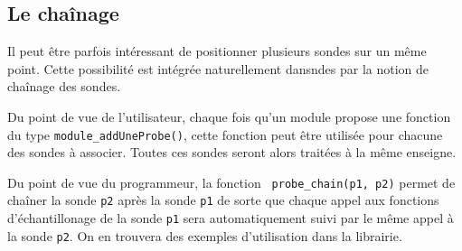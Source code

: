 %
\subsection{Le chaînage}

   Il peut être parfois intéressant de positionner plusieurs sondes
sur un même point. Cette possibilité est intégrée naturellement
dans{\sc ndes} par la notion de chaînage des sondes.

   Du point de vue de l'utilisateur, chaque fois qu'un module propose
une fonction du type {\tt module\_addUneProbe()}, cette fonction peut
être utilisée pour chacune des sondes à associer. Toutes ces sondes
seront alors traitées à la même enseigne.

   Du point de vue du programmeur, la fonction {\tt
probe\_chain(p1, p2)}  permet de chaîner la sonde
   {\tt p2} après la sonde {\tt p1} de sorte que chaque appel aux
     fonctions d'échantillonage de la sonde {\tt p1} sera
     automatiquement suivi par le même appel à la sonde {\tt p2}. On
     en trouvera des exemples d'utilisation dans la librairie.

